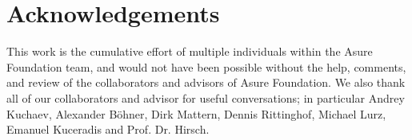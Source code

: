 \section{Acknowledgements}

This work is the cumulative effort of multiple individuals within the Asure Foundation team, and would not have been possible without the help, comments, and review of the collaborators and advisors of Asure Foundation. We also thank all of our collaborators and advisor for useful conversations; in particular Andrey Kuchaev, Alexander Böhner, Dirk Mattern, Dennis Rittinghof, Michael Lurz, Emanuel Kuceradis and Prof. Dr. Hirsch.
